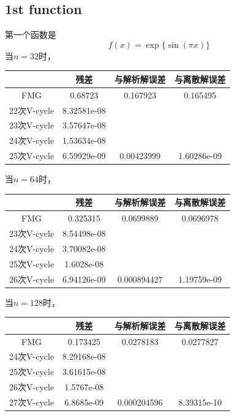 \documentclass[a4paper,11.5pt,UTF8]{ctexart}
\begin{document}
\begin{large}
\subsection{1st function}
\par 第一个函数是$$f(x)=\exp\{\sin(\pi x)\}$$
当$n=32$时，
\begin{center}
	\begin{tabular}{|c|c|c|c|}
		\hline
		 & 残差 & 与解析解误差 & 与离散解误差 \\
		\hline
		FMG & 0.68723 & 0.167923 & 0.165495 \\
		\hline
		22次V-cycle & 8.32581e-08 & ~ & ~ \\
		\hline
		23次V-cycle & 3.57647e-08 & ~ & ~ \\
		\hline
		24次V-cycle & 1.53634e-08 & ~ & ~ \\
		\hline
		25次V-cycle & 6.59929e-09 & 0.00423999 & 1.60286e-09 \\
		\hline
	\end{tabular}
\end{center}
当$n=64$时，
\begin{center}
	\begin{tabular}{|c|c|c|c|}
		\hline
		& 残差 & 与解析解误差 & 与离散解误差 \\
		\hline
		FMG & 0.325315 & 0.0699889 & 0.0696978 \\
		\hline
		23次V-cycle & 8.54498e-08 & ~ & ~ \\
		\hline
		24次V-cycle & 3.70082e-08 & ~ & ~ \\
		\hline
		25次V-cycle & 1.6028e-08 & ~ & ~ \\
		\hline
		26次V-cycle & 6.94126e-09 & 0.000894427 & 1.19759e-09 \\
		\hline
	\end{tabular}
\end{center}
当$n=128$时，
\begin{center}
	\begin{tabular}{|c|c|c|c|}
		\hline
		& 残差 & 与解析解误差 & 与离散解误差 \\
		\hline
		FMG & 0.173425 & 0.0278183 & 0.0277827 \\
		\hline
		24次V-cycle & 8.29168e-08 & ~ & ~ \\
		\hline
		25次V-cycle & 3.61615e-08 & ~ & ~ \\
		\hline
		26次V-cycle & 1.5767e-08 & ~ & ~ \\
		\hline
		27次V-cycle & 6.8685e-09 & 0.000204596 & 8.39315e-10 \\
		\hline
	\end{tabular}

\end{center}
\end{large}
\end{document}
